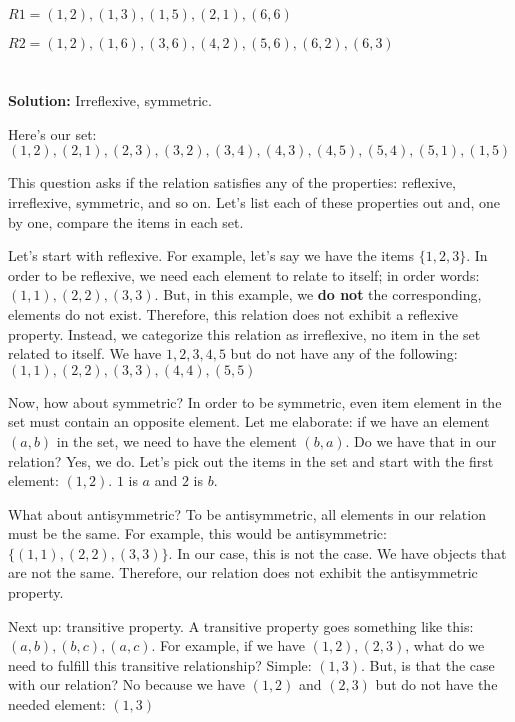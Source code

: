 \documentclass{article}
\begin{document}
$R1 = (1,2), (1,3), (1,5), (2,1), (6,6)$

$R2 = (1,2), (1,6), (3,6), (4,2), (5,6), (6,2), (6,3)$

\section{}

\textbf{Solution:} Irreflexive, symmetric.

Here's our set: ${(1,2), (2,1), (2,3), (3,2), (3,4), (4,3), (4,5), (5,4), (5,1), (1,5)}$

This question asks if the relation satisfies any of the properties: reflexive, irreflexive, symmetric, and so on. Let's list each of these properties out and, one by one, compare the items in each set.

Let's start with reflexive. For example, let's say we have the items $\{1,2,3\}$. In order to be reflexive, we need each element to relate to itself; in order words: ${(1,1), (2,2), (3,3)}$. But, in this example, we \textbf{do not} the corresponding, elements do not exist. Therefore, this relation does not exhibit a reflexive property. Instead, we categorize this relation as irreflexive, no item in the set related to itself. We have ${1,2,3,4,5}$ but do not have any of the following: ${(1,1), (2,2), (3,3), (4, 4), (5, 5)}$

Now, how about symmetric? In order to be symmetric, even item element in the set must contain an opposite element. Let me elaborate: if we have an element $(a,b)$ in the set, we need to have the element $(b, a)$. Do we have that in our relation? Yes, we do. Let's pick out the items in the set and start with the first element: ${(1,2)}$. $1$ is $a$ and $2$ is $b$. 

What about antisymmetric? To be antisymmetric, all elements in our relation must be the same. For example, this would be antisymmetric: $\{(1,1), (2,2), (3,3)\}$. In our case, this is not the case. We have objects that are not the same. Therefore, our relation does not exhibit the antisymmetric property.

Next up: transitive property. A transitive property goes something like this: $(a,b), (b,c), (a,c)$. For example, if we have $(1,2), (2,3)$, what do we need to fulfill this transitive relationship? Simple: $(1,3)$. But, is that the case with our relation? No because we have $(1,2)$ and $(2,3)$ but do not have the needed element: $(1,3)$

\section{}
\end{document}
